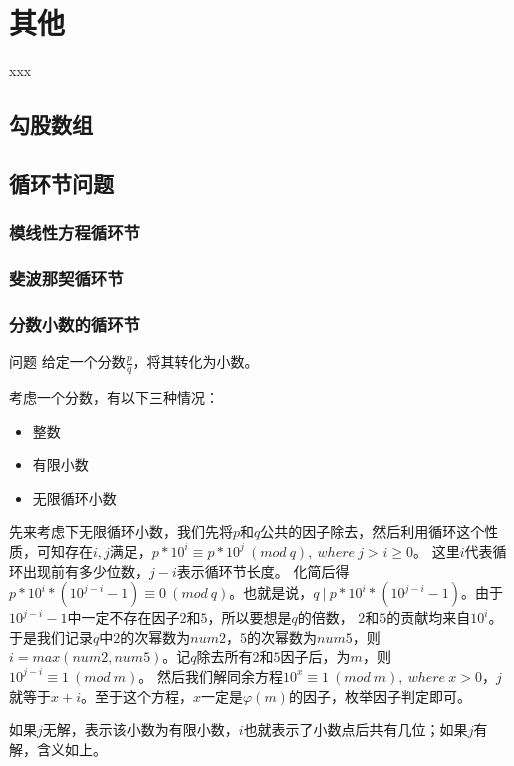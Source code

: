 \chapter{其他}
\begin{introduction}[本章内容提要]
	\item xxx
\end{introduction}

\section{勾股数组}

\section{循环节问题}
\subsection{模线性方程循环节}

\subsection{斐波那契循环节}

\subsection{分数小数的循环节}
\begin{custom}{问题}
给定一个分数$\frac{p}{q}$，将其转化为小数。
\end{custom}

\begin{solution}
考虑一个分数，有以下三种情况：
\begin{itemize}
	\item 整数
	\item 有限小数
	\item 无限循环小数
\end{itemize}

先来考虑下无限循环小数，我们先将$p$和$q$公共的因子除去，然后利用循环这个性质，可知存在$i,j$满足，$p*10^i \equiv p*10^j \ (mod \ q), \ where\ j>i\ge0$。
{\heiti 这里$i$代表循环出现前有多少位数，$j-i$表示循环节长度。}
化简后得$p*10^i*(10^{j-i}-1) \equiv 0\   (mod \ q)$。也就是说，$q\ |\ p*10^i*(10^{j-i}-1)$。由于$10^{j-i}-1$中一定不存在因子$2$和$5$，所以要想是$q$的倍数，
$2$和$5$的贡献均来自$10^i$。于是我们记录$q$中$2$的次幂数为$num2$，$5$的次幂数为$num5$，则$i = max(num2,num5)$。记$q$除去所有$2$和$5$因子后，为$m$，则$10^{j-i}\equiv 1 \ (mod\ m)$。
然后我们解同余方程$10^x\equiv 1\ (mod\ m),\ where\ x>0$，$j$就等于$x+i$。至于这个方程，$x$一定是$\varphi(m)$的因子，枚举因子判定即可。

如果$j$无解，表示该小数为有限小数，$i$也就表示了小数点后共有几位；如果$j$有解，含义如上。
\end{solution}

